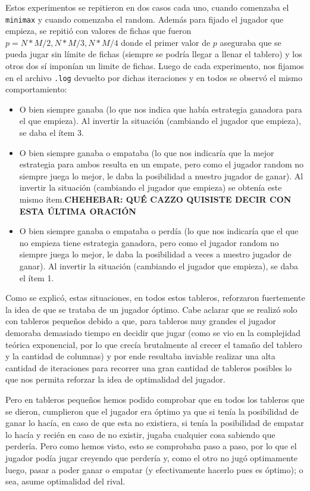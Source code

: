 \documentclass[A4paper,oneside,fleqn,11pt]{article}
\theoremstyle{definition}
\begin{document}
Estos experimentos se repitieron en dos casos cada uno, cuando comenzaba el \texttt{minimax} y cuando comenzaba el random. Además para fijado el jugador que empieza, se repitió con valores de fichas que fueron $p=N*M/2, N*M/3, N*M/4$ donde el primer valor de $p$ aseguraba que se pueda jugar sin límite de fichas (siempre se podría llegar a llenar el tablero) y los otros dos sí imponían un limite de fichas. Luego de cada experimento, nos fijamos en el archivo \texttt{.log} devuelto por dichas iteraciones y en todos se observó el mismo comportamiento:
\begin{itemize}
\item O bien siempre ganaba (lo que nos indica que había estrategia ganadora para el que empieza). Al invertir la situación (cambiando el jugador que empieza), se daba el ítem 3.
\item O bien siempre ganaba o empataba (lo que nos indicaría que la mejor estrategia para ambos resulta en un empate, pero como el jugador random no siempre juega lo mejor, le daba la posibilidad a nuestro jugador de ganar). Al invertir la situación (cambiando el jugador que empieza) se obtenía este mismo ítem.\textbf{CHEHEBAR: QUÉ CAZZO QUISISTE DECIR CON ESTA ÚLTIMA ORACIÓN}
\item O bien siempre ganaba o empataba o perdía (lo que nos indicaría que el que no empieza tiene estrategia ganadora, pero como el jugador random no siempre juega lo mejor, le daba la posibilidad a veces a nuestro jugador de ganar). Al invertir la situación (cambiando el jugador que empieza), se daba el ítem 1.
\end{itemize}

Como se explicó, estas situaciones, en todos estos tableros, reforzaron fuertemente la idea de que se trataba de un jugador óptimo. Cabe aclarar que se realizó solo con tableros pequeños debido a que, para tableros muy grandes el jugador demoraba demasiado tiempo en decidir que jugar (como se vio en la complejidad teórica exponencial, por lo que crecía brutalmente al crecer el tamaño del tablero y la cantidad de columnas) y por ende resultaba inviable realizar una alta cantidad de iteraciones para recorrer una gran cantidad de tableros posibles lo que nos permita reforzar la idea de optimalidad del jugador. 

Pero en tableros pequeños hemos podido comprobar que en todos los tableros que se dieron, cumplieron que el jugador era óptimo ya que si tenía la posibilidad de ganar lo hacía, en caso de que esta no existiera, si tenía la posibilidad de empatar lo hacía y recién en caso de no existir, jugaba cualquier cosa sabiendo que perdería. Pero como hemos visto, esto se comprobaba paso a paso, por lo que el jugador podía jugar creyendo que perdería y, como el otro no jugó optimamente luego, pasar a poder ganar o empatar (y efectivamente hacerlo pues es óptimo); o sea, asume optimalidad del rival.
\end{document}
